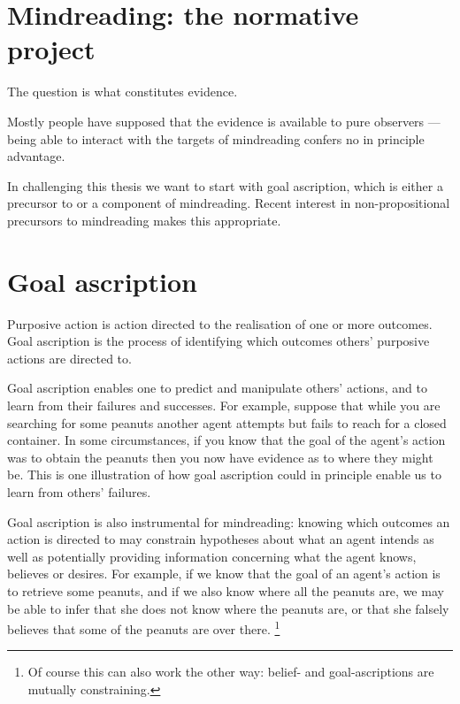 \documentclass[12pt,a4paper]{extarticle}
\begin{document}
\setlength\footnotesep{1em}


\maketitle

\begin{abstract}
***
\end{abstract}


\section{Mindreading: the normative project}

The question is what constitutes evidence.

Mostly people have supposed that the evidence is available to pure observers --- being able to interact with the targets of mindreading confers no in principle advantage.

In challenging this thesis we want to start with goal ascription, which is either a precursor to or a component of mindreading.
Recent interest in non-propositional precursors to mindreading makes this appropriate.


\section{Goal ascription}
Purposive action is action directed to the realisation of one or more outcomes.
Goal ascription is the process of identifying which outcomes others' purposive actions are directed to.

Goal ascription enables one
to predict and manipulate others' actions, and 
to learn from their failures and successes.
For example, suppose that while you are searching for some peanuts 
another agent attempts but fails to reach for a closed container.
In some circumstances,
if you know that the goal of the agent's action was to obtain the peanuts
then you now have evidence as to where they might be.
This is one illustration of how goal ascription could in principle enable us to learn from others' failures.

Goal ascription is also instrumental for mindreading:
knowing which outcomes an action is directed to may constrain hypotheses about what an agent intends 
as well as
potentially providing information concerning what the agent knows, believes or desires.
For example,
if we know that the goal of an agent's action is to retrieve some peanuts,
and if we also know where all the peanuts are,
we may be able to infer that she does not know where the peanuts are,
or that she falsely believes that some of the peanuts are over there.%
\footnote{
Of course this can also work the other way:
belief- and goal-ascriptions are mutually constraining.
}
\end{document}
